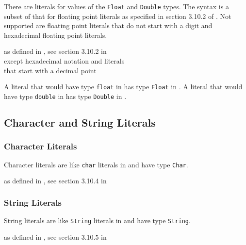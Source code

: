 There are literals for values of the \texttt{Float} and \texttt{Double} types. The syntax is a subset of that for \java{} floating point literals as specified in section 3.10.2 of \cite{langspec3}. Not supported are floating point literals that do not start with a digit and hexadecimal floating point literals.

\begin{flushleft}
as defined in \java{}, see section 3.10.2 in \cite{langspec3}\\
\hspace{0.5in} except hexadecimal notation and literals\\
\hspace{0.5in} that start with a decimal point
\end{flushleft}

A literal that would have type \texttt{float} in \java{} has type \texttt{Float} in \frege{}. A literal that would have type \texttt{double} in \java{} has type \texttt{Double} in \frege{}.

\subsection{Character and String Literals}

\subsubsection{Character Literals}

Character literals are like \texttt{char} literals in \java{} and have type \texttt{Char}.

\begin{flushleft}
as defined in \java{}, see section 3.10.4 in \cite{langspec3}\\
\end{flushleft}


\subsubsection{String Literals}

String literals are like \texttt{String} literals in \java{} and have type \texttt{String}.

\begin{flushleft}
as defined in \java{}, see section 3.10.5 in \cite{langspec3}\\
\end{flushleft}

